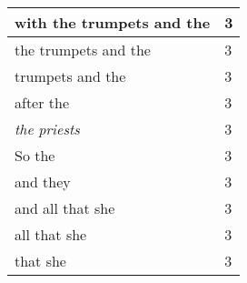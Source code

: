 \begin{center}
\begin{longtable}{|p{3.0in}|p{0.5in}|}
with the trumpets and the & 3\\ \hline 
the trumpets and the & 3\\ \hline 
trumpets and the & 3\\ \hline 
after the & 3\\ \hline 
\emph{the} \emph{priests} & 3\\ \hline 
So the & 3\\ \hline 
and they & 3\\ \hline 
and all that she & 3\\ \hline 
all that she & 3\\ \hline 
that she & 3\\ \hline 
\end{longtable}
\end{center}





